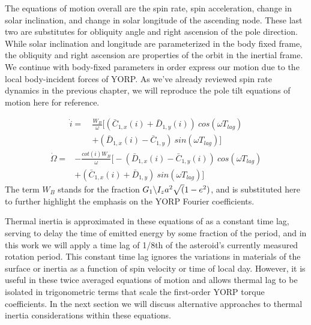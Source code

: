 The equations of motion overall are the spin rate, spin acceleration, change in solar inclination, and change in solar longitude of the ascending node. These last two are substitutes for obliquity angle and right ascension of the pole direction. While solar inclination and longitude are parameterized in the body fixed frame, the obliquity and right ascension are properties of the orbit in the inertial frame. We continue with body-fixed parameters in order express our motion due to the local body-incident forces of YORP. As we've already reviewed spin rate dynamics in the previous chapter, we will reproduce the pole tilt equations of motion here for reference.

\begin{equation}
    \begin{split}
    \dot{i} = \:&\frac{\mathit{W}_B}{\omega}\Big[(\bar{C}_{1,x}(i)+\bar{D}_{1,y}(i))\: cos(\omega T_{lag}) \\
    & + (\bar{D}_{1,x}(i)-\bar{C}_{1,y})\: sin(\omega T_{lag})\Big]
    \end{split}
\end{equation}
\begin{equation}
    \begin{split}
    \dot{\Omega} = &-\frac{cot(i)\mathit{W}_B}{\omega}\Big[- (\bar{D}_{1,x}(i)-\bar{C}_{1,y}(i)) \:cos(\omega T_{lag}) \\
    & + (\bar{C}_{1,x}(i)+\bar{D}_{1,y}) \:sin(\omega T_{lag})\Big]
    \end{split}
\end{equation}
The term $W_B$ stands for the fraction $G_1 \symbol{92} I_z a^2 \sqrt(1-e^2)$, and is substituted here to further highlight the emphasis on the YORP Fourier coefficients. 

Thermal inertia is approximated in these equations of as a constant time lag, serving to delay the time of emitted energy by some fraction of the period, and in this work we will apply a time lag of 1/8th of the asteroid's currently measured rotation period. This constant time lag ignores the variations in materials of the surface or inertia as a function of spin velocity or time of local day. However, it is useful in these twice averaged equations of motion and allows thermal lag to be isolated in trigonometric terms that scale the first-order YORP torque coefficients. In the next section we will discuss alternative approaches to thermal inertia considerations within these equations. 

